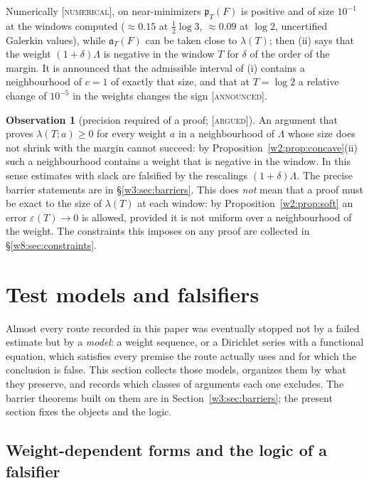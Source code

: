 \documentclass[11pt]{amsart}
\theoremstyle{definition}
\newtheorem{observation}[theorem]{Observation}
\theoremstyle{remark}
\numberwithin{equation}{section}
\newcommand{\pT}{\mathfrak{p}_T}                       %
\newcommand{\aT}{\mathfrak{a}_T}                       %
\newcommand{\lam}{\lambda(T)}                          %
\newcommand{\stag}[1]{\textsc{[#1]}}
\newcommand{\ARGUED}{\stag{argued}}
\newcommand{\NUM}{\stag{numerical}}
\newcommand{\ANNOUNCED}{\stag{announced}}
\begin{document}
Numerically \NUM, on near-minimizers $\pT(F)$ is positive and of size $10^{-1}$ at the windows computed ($\approx0.15$
at $\frac12\log3$, $\approx0.09$ at $\log2$, uncertified Galerkin values), while $\aT(F)$ can be taken close to $\lam$;
then (ii) says that the weight
$(1+\delta)\Lambda$ is negative in the window $T$ for $\delta$ of the order of the margin. It is announced that the
admissible interval of (i) contains a neighbourhood of $c=1$ of exactly that size, and that at $T=\log2$ a relative change
of $10^{-5}$ in the weights changes the sign \ANNOUNCED.

\begin{observation}[precision required of a proof; \ARGUED]\label{w2:obs:precision}
An argument that proves $\lambda(T;a)\ge0$ for every weight $a$ in a neighbourhood of $\Lambda$ whose size does not
shrink with the margin cannot succeed: by Proposition~\ref{w2:prop:concave}(ii) such a neighbourhood contains a weight that
is negative in the window. In this sense estimates with slack are falsified by the rescalings $(1+\delta)\Lambda$. The
precise barrier statements are in \S\ref{w3:sec:barriers}. This does \emph{not} mean that a proof must be exact to the
size of $\lam$ at each window: by Proposition~\ref{w2:prop:soft} an error $\varepsilon(T)\to0$ is allowed, provided it
is not uniform over a neighbourhood of the weight. The constraints this imposes on any proof are collected in
\S\ref{w8:sec:constraints}.
\end{observation}


\section{Test models and falsifiers}\label{w3:sec:falsifiers}

Almost every route recorded in this paper was eventually stopped not by a failed estimate but by a
\emph{model}: a weight sequence, or a Dirichlet series with a functional equation, which satisfies every
premise the route actually uses and for which the conclusion is false. This section collects those models,
organizes them by what they preserve, and records which classes of arguments each one excludes. The barrier
theorems built on them are in Section~\ref{w3:sec:barriers}; the present section fixes the objects and the
logic.

\subsection{Weight-dependent forms and the logic of a falsifier}\label{w3:subsec:logic}
\end{document}
